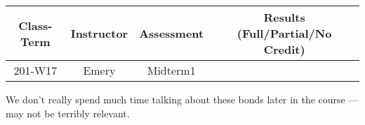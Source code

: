 
\begin{outcomes}
	\begin{center}
		\begin{tabular}{cccc}
			\hline\hline
                Class-Term & Instructor & Assessment & Results (Full/Partial/No Credit) \\
			\hline
                201-W17 & Emery & Midterm1 &  \\
			\hline
		\end{tabular}
	\end{center}
\end{outcomes}

\begin{comments}

We don't really spend much time talking about these bonds later in the course --- may not be terribly relevant.
	
\end{comments}